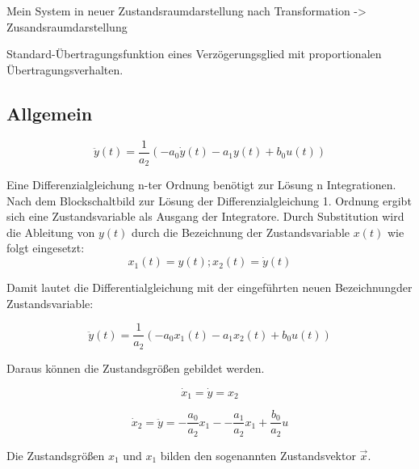 Mein System in neuer Zustandsraumdarstellung nach Transformation
-> Zusandsraumdarstellung



Standard-Übertragungsfunktion eines 
Verzögerungsglied mit proportionalen Übertragungsverhalten.
\subsection*{Allgemein}

\begin{equation*}
  \ddot y(t)= \frac{1}{a_2}(-a_0\dot y(t)-a_1 y(t) +b_0u(t))
\end{equation*}

Eine Differenzialgleichung n-ter Ordnung benötigt zur Lösung n Integrationen. 
Nach dem Blockschaltbild zur Lösung der Differenzialgleichung 1. Ordnung ergibt sich eine Zustandsvariable als Ausgang der Integratore. 
Durch Substitution wird die Ableitung von $y(t)$ durch die Bezeichnung der Zustandsvariable $x(t)$ wie folgt eingesetzt: 
\begin{equation*}
  x_1(t) = y(t); x_2(t) = \dot y(t)
\end{equation*}

Damit lautet die Differentialgleichung mit der eingeführten neuen Bezeichnungder Zustandsvariable:

\begin{equation*}
  \ddot y(t)= \frac{1}{a_2}(-a_0 x_1(t)-a_1 x_2(t) +b_0u(t))
\end{equation*}

Daraus können die Zustandsgrößen gebildet werden.

\begin{equation*}
  \dot x_1 = \dot y = x_2
\end{equation*}

\begin{equation*}
  \dot x_2= \ddot y = -\frac{a_0}{a_2}x_1--\frac{a_1}{a_2}x_1+\frac{b_0}{a_2}u
\end{equation*}

Die Zustandsgrößen $x_1$ und $x_1$ bilden den sogenannten Zustandsvektor $\vec x$.


